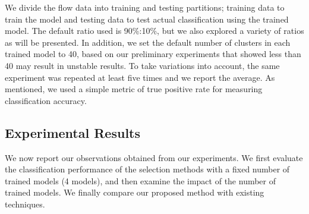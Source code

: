 \documentclass[conference]{IEEEtran}
\begin{document}

We divide the flow data into training and testing partitions; training data to train the model and testing data to test actual classification using the trained model.
The default ratio used is 90\%:10\%, but we also explored  a variety of ratios as will be presented. 
In addition, we set the default number of clusters in each trained model to 40, based on our preliminary experiments that showed less than 40 may result in unstable results.
To take variations into account, the same experiment was repeated at least five times and we report the average.
As mentioned, we used a simple metric of true positive rate for measuring classification accuracy.


\subsection{Experimental Results}

We now report our observations obtained from our experiments.
We first evaluate the classification performance of the selection methods with a fixed number of trained models (4 models), and then examine the impact of the number of trained models.
We finally compare our proposed method with existing techniques.
\end{document}
